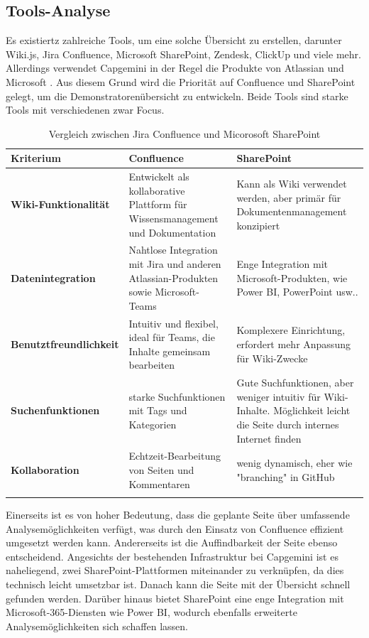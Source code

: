 \documentclass[a4paper, 12pt]{scrartcl}
\begin{document}
	\subsection{Tools-Analyse}%
Es existiertz zahlreiche Tools, um eine solche Übersicht zu erstellen, darunter Wiki.js, Jira Confluence, Microsoft SharePoint, Zendesk, ClickUp und viele mehr. Allerdings verwendet Capgemini in der Regel die Produkte von Atlassian und Microsoft . Aus diesem Grund wird die Priorität auf Confluence\cite{Confluence} und SharePoint\cite{SharePoint} gelegt, um die Demonstratorenübersicht zu entwickeln. Beide Tools sind starke Tools mit verschiedenen zwar Focus.
\newpage
	\begin{longtable}{|p{4.5cm}|p{5.5cm}|p{5.5cm}|}
		\hline
		\textbf{Kriterium} & \textbf{Confluence} & \textbf{SharePoint} \\ \hline
		\textbf{Wiki-Funktionalität} & Entwickelt als kollaborative Plattform für Wissensmanagement und Dokumentation & Kann als Wiki verwendet werden, aber primär für Dokumentenmanagement konzipiert \\ \hline
		\textbf{Datenintegration} & Nahtlose Integration mit Jira und anderen Atlassian-Produkten sowie Microsoft-Teams & Enge Integration mit Microsoft-Produkten, wie Power BI, PowerPoint usw..\\ \hline
		\textbf{Benutztfreundlichkeit} & Intuitiv und flexibel, ideal für Teams, die Inhalte gemeinsam bearbeiten & Komplexere Einrichtung, erfordert mehr Anpassung für Wiki-Zwecke\\ \hline
		\textbf{Suchenfunktionen} &starke Suchfunktionen mit Tags und Kategorien & Gute Suchfunktionen, aber weniger intuitiv für Wiki-Inhalte. Möglichkeit leicht die Seite durch internes Internet finden  \\ \hline
		\textbf{Kollaboration} &Echtzeit-Bearbeitung von Seiten und Kommentaren & wenig dynamisch, eher wie "branching" in GitHub \\ \hline
		\caption{Vergleich zwischen Jira Confluence und Micorosoft SharePoint}
	\end{longtable}
Einerseits ist es von hoher Bedeutung, dass die geplante Seite über umfassende Analysemöglichkeiten verfügt, was durch den Einsatz von Confluence effizient umgesetzt werden kann. Andererseits ist die Auffindbarkeit der Seite ebenso entscheidend. Angesichts der bestehenden Infrastruktur bei Capgemini ist es naheliegend, zwei SharePoint-Plattformen miteinander zu verknüpfen, da dies technisch leicht umsetzbar ist. Danach kann die Seite mit der Übersicht schnell gefunden werden. Darüber hinaus bietet SharePoint eine enge Integration mit Microsoft-365-Diensten wie Power BI, wodurch ebenfalls erweiterte Analysemöglichkeiten sich schaffen lassen.
\end{document}
